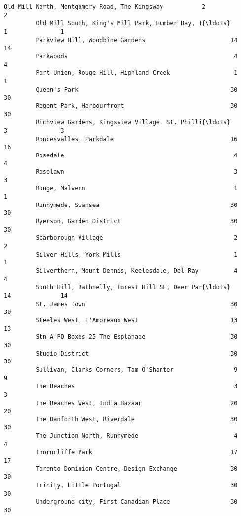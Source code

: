 \documentclass[11pt]{article}
\begin{document}
\begin{Verbatim}[commandchars=\\\{\}]
         Old Mill North, Montgomery Road, The Kingsway           2               2   
         Old Mill South, King's Mill Park, Humber Bay, T{\ldots}      1               1   
         Parkview Hill, Woodbine Gardens                        14              14   
         Parkwoods                                               4               4   
         Port Union, Rouge Hill, Highland Creek                  1               1   
         Queen's Park                                           30              30   
         Regent Park, Harbourfront                              30              30   
         Richview Gardens, Kingsview Village, St. Philli{\ldots}      3               3   
         Roncesvalles, Parkdale                                 16              16   
         Rosedale                                                4               4   
         Roselawn                                                3               3   
         Rouge, Malvern                                          1               1   
         Runnymede, Swansea                                     30              30   
         Ryerson, Garden District                               30              30   
         Scarborough Village                                     2               2   
         Silver Hills, York Mills                                1               1   
         Silverthorn, Mount Dennis, Keelesdale, Del Ray          4               4   
         South Hill, Rathnelly, Forest Hill SE, Deer Par{\ldots}     14              14   
         St. James Town                                         30              30   
         Steeles West, L'Amoreaux West                          13              13   
         Stn A PO Boxes 25 The Esplanade                        30              30   
         Studio District                                        30              30   
         Sullivan, Clarks Corners, Tam O'Shanter                 9               9   
         The Beaches                                             3               3   
         The Beaches West, India Bazaar                         20              20   
         The Danforth West, Riverdale                           30              30   
         The Junction North, Runnymede                           4               4   
         Thorncliffe Park                                       17              17   
         Toronto Dominion Centre, Design Exchange               30              30   
         Trinity, Little Portugal                               30              30   
         Underground city, First Canadian Place                 30              30   

\end{Verbatim}
\end{document}
